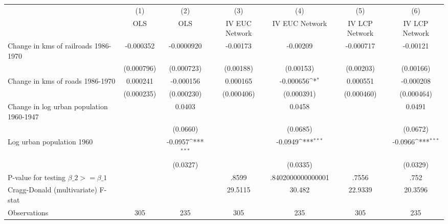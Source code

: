{
\def\sym#1{\ifmmode^{#1}\else\(^{#1}\)\fi}
\begin{tabular}{l*{6}{c}}
\hline\hline
                &\multicolumn{1}{c}{(1)}&\multicolumn{1}{c}{(2)}&\multicolumn{1}{c}{(3)}&\multicolumn{1}{c}{(4)}&\multicolumn{1}{c}{(5)}&\multicolumn{1}{c}{(6)}\\
                &\multicolumn{1}{c}{OLS}&\multicolumn{1}{c}{OLS}&\multicolumn{1}{c}{IV EUC Network}&\multicolumn{1}{c}{IV EUC Network}&\multicolumn{1}{c}{IV LCP Network}&\multicolumn{1}{c}{IV LCP Network}\\
\hline
Change in kms of railroads 1986-1970&-0.000352         &-0.0000920         & -0.00173         & -0.00209         &-0.000717         & -0.00121         \\
                &(0.000796)         &(0.000723)         &(0.00188)         &(0.00153)         &(0.00203)         &(0.00166)         \\
[1em]
Change in kms of roads 1986-1970& 0.000241         &-0.000156         & 0.000165         &-0.000656\sym{*}  & 0.000551         &-0.000208         \\
                &(0.000235)         &(0.000230)         &(0.000406)         &(0.000391)         &(0.000460)         &(0.000464)         \\
[1em]
Change in log urban population 1960-1947&                  &   0.0403         &                  &   0.0458         &                  &   0.0491         \\
                &                  & (0.0660)         &                  & (0.0685)         &                  & (0.0672)         \\
[1em]
Log urban population 1960&                  &  -0.0957\sym{***}&                  &  -0.0949\sym{***}&                  &  -0.0966\sym{***}\\
                &                  & (0.0327)         &                  & (0.0335)         &                  & (0.0329)         \\
\hline
P-value for testing $\beta\_{2} >= \beta\_{1}$&                  &                  &    .8599         &.8402000000000001         &    .7556         &     .752         \\
Cragg-Donald (multivariate) F-stat&                  &                  &  29.5115         &   30.482         &  22.9339         &  20.3596         \\
Observations    &      305         &      235         &      305         &      235         &      305         &      235         \\
\hline\hline
\end{tabular}
}

